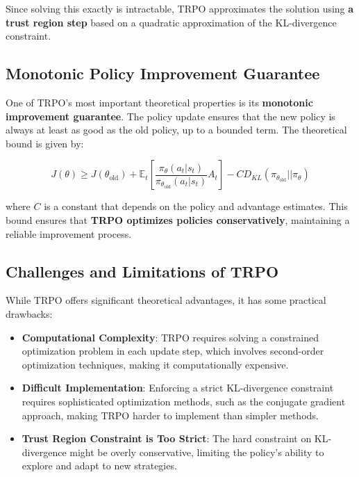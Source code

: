 \documentclass[12pt]{extreport} %
\begin{document}
Since solving this exactly is intractable, TRPO approximates the solution using \textbf{a trust region step} based on a quadratic approximation of the KL-divergence constraint.

\subsection{\textbf{Monotonic Policy Improvement Guarantee}}

One of TRPO's most important theoretical properties is its \textbf{monotonic improvement guarantee}. The policy update ensures that the new policy is always at least as good as the old policy, up to a bounded term. The theoretical bound is given by:

\begin{equation}
J(\theta) \geq J(\theta_{\text{old}}) + \mathbb{E}_t \left[ \frac{\pi_{\theta}(a_t | s_t)}{\pi_{\theta_{\text{old}}}(a_t | s_t)} A_t \right] - C D_{KL} (\pi_{\theta_{\text{old}}} || \pi_{\theta})
\end{equation}

where \( C \) is a constant that depends on the policy and advantage estimates. This bound ensures that \textbf{TRPO optimizes policies conservatively}, maintaining a reliable improvement process.

\subsection{\textbf{Challenges and Limitations of TRPO}}

While TRPO offers significant theoretical advantages, it has some practical drawbacks:

\begin{itemize}
    \item \textbf{Computational Complexity}: TRPO requires solving a constrained optimization problem in each update step, which involves second-order optimization techniques, making it computationally expensive.
    \item \textbf{Difficult Implementation}: Enforcing a strict KL-divergence constraint requires sophisticated optimization methods, such as the conjugate gradient approach, making TRPO harder to implement than simpler methods.
    \item \textbf{Trust Region Constraint is Too Strict}: The hard constraint on KL-divergence might be overly conservative, limiting the policy's ability to explore and adapt to new strategies.
\end{itemize}
\end{document}
